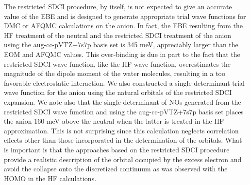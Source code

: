 The restricted SDCI procedure, by itself, is not expected to give an accurate value of the EBE and is designed to generate appropriate trial wave functions for DMC or AFQMC calculations on the anion.
In fact, the EBE resulting from the HF treatment of the neutral and the restricted SDCI treatment of the anion using the aug-cc-pVTZ+7s7p basis set is 345 meV, appreciably larger than the EOM and AFQMC values.
This over-binding is due in part to the fact that the restricted SDCI wave function, like the HF wave function, overestimates the magnitude of the dipole moment of the water molecules, resulting in a too favorable electrostatic interaction.
We also constructed a single determinant trial wave function for the anion using the natural orbitals of the restricted SDCI expansion.
We note also that the single determinant of NOs generated from the restricted SDCI wave function and using the aug-cc-pVTZ+7s7p basis set places the anion 160 meV above the neutral when the latter is treated in the HF approximation. 
This is not surprising since this calculation neglects correlation effects other than those incorporated in the determination of the orbitals.
What is important is that the approaches based on the restricted SDCI procedure provide a realistic description of the orbital occupied by the excess electron and avoid the collapse onto the discretized continuum as was observed with the HOMO in the HF calculations. 

